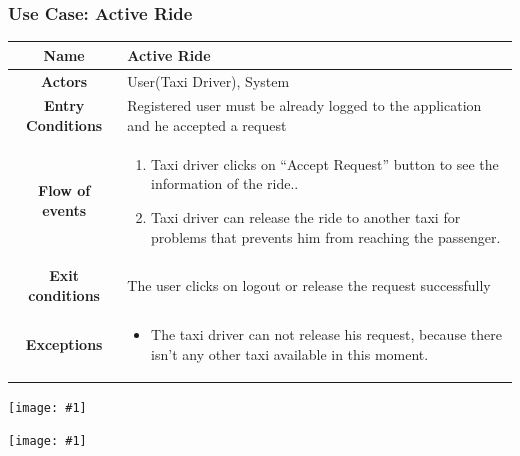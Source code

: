 \documentclass[11pt, a4paper,titlepage]{article}
\newcommand{\image}[1]{
	\begin{center}
		\noindent \texttt{[image: \#1]}
	\end{center}
	}
\begin{document}
\subsubsection{Use Case: Active Ride}
		\begin{tabularx}{\textwidth}{| c | X |}
			\hline
			\textbf{Name} & 
			Active Ride
			\\
			\hline
			\textbf{Actors} & 
			User(Taxi Driver), System 
			\\
			\hline
			\textbf{Entry Conditions} &
			Registered user must be already logged to the application and he accepted a request
			\\
			\hline
			\textbf{Flow of events} & 
			\begin{enumerate}
				\item Taxi driver clicks on “Accept Request” button to see the information of the ride..
				\item Taxi driver can release the ride to another taxi for problems that prevents him from reaching the passenger.
			\end{enumerate}						
			\\
			\hline
			\textbf{Exit conditions} & 
			The user clicks on logout or release the request successfully
			\\
			\hline
			\textbf{Exceptions} & 
			\begin{itemize}
				\item The taxi driver can not release his request, because there isn't any other taxi available in this moment.
			\end{itemize} 
			\\
			\hline		
		\end{tabularx}
		\image{usecase_active_ride.png}
		\image{diagram_sequence_active_ride.png}
		\newpage
\end{document}
